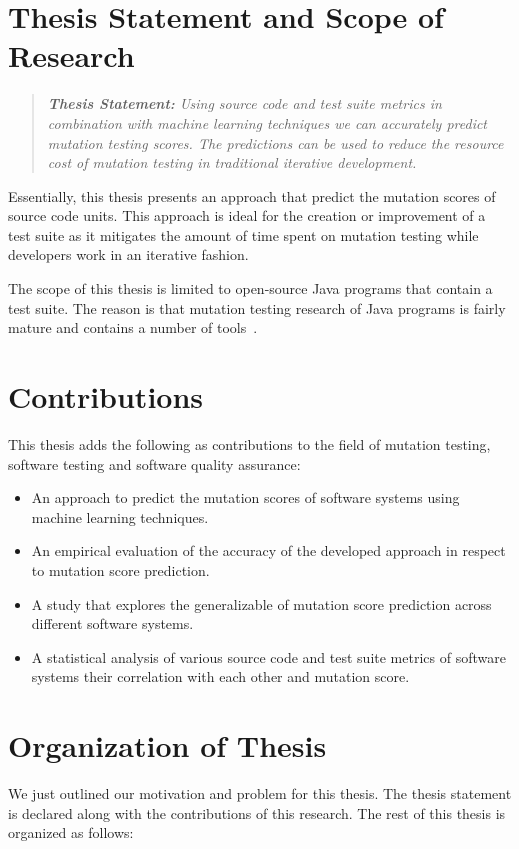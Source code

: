 \section{Thesis Statement and Scope of Research}
\label{sec:introduction_statement_and_scope}
\begin{quote}
  \emph{\textbf{Thesis Statement:} Using source code and test suite metrics in combination with machine learning techniques we can accurately predict mutation testing scores. The predictions can be used to reduce the resource cost of mutation testing in traditional iterative development.}
\end{quote}

Essentially, this thesis presents an approach that predict the mutation scores of source code units. This approach is ideal for the creation or improvement of a test suite as it mitigates the amount of time spent on mutation testing while developers work in an iterative fashion.

The scope of this thesis is limited to open-source Java programs that contain a test suite. The reason is that mutation testing research of Java programs is fairly mature and contains a number of tools~\cite{JH10}.


\section{Contributions}
\label{sec:introduction_contributions}
This thesis adds the following as contributions to the field of mutation testing, software testing and software quality assurance:

\begin{itemize}
  \item An approach to predict the mutation scores of software systems using machine learning techniques.
  \item An empirical evaluation of the accuracy of the developed approach in respect to mutation score prediction.
  \item A study that explores the generalizable of mutation score prediction across different software systems.
  \item A statistical analysis of various source code and test suite metrics of software systems their correlation with each other and mutation score.
\end{itemize}


\section{Organization of Thesis}
\label{sec:introduction_organization}
We just outlined our motivation and problem for this thesis. The thesis statement is declared along with the contributions of this research. The rest of this thesis is organized as follows:

